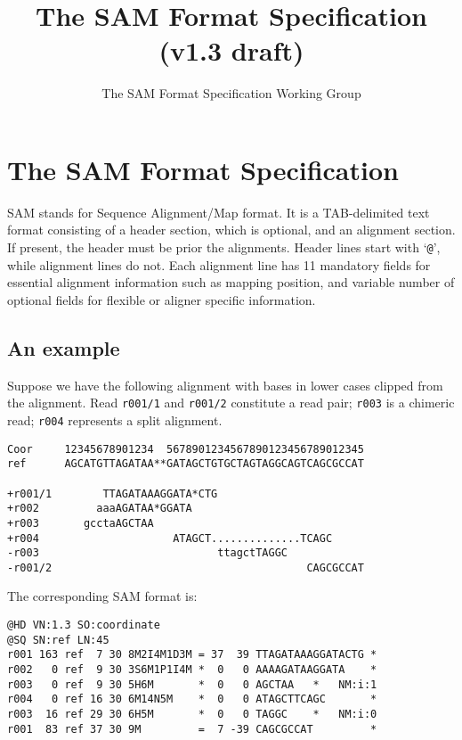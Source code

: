 \documentclass[10pt]{article}
\title{The SAM Format Specification (v1.3 draft)}
\author{The SAM Format Specification Working Group}
\begin{document}
\maketitle


\section{The SAM Format Specification}
SAM stands for Sequence Alignment/Map format. It is a TAB-delimited text
format consisting of a header section, which is optional, and an
alignment section. If present, the header must be prior the
alignments. Header lines start with `{\tt @}', while alignment lines do
not. Each alignment line has 11 mandatory fields for essential alignment
information such as mapping position, and variable number of optional
fields for flexible or aligner specific information.

\subsection{An example}
Suppose we have the following alignment with bases in lower cases
clipped from the alignment. Read {\tt r001/1} and {\tt r001/2}
constitute a read pair; {\tt r003} is a chimeric read; {\tt r004}
represents a split alignment.

\begin{framed}\small
\begin{verbatim}
Coor     12345678901234  5678901234567890123456789012345
ref      AGCATGTTAGATAA**GATAGCTGTGCTAGTAGGCAGTCAGCGCCAT

+r001/1        TTAGATAAAGGATA*CTG
+r002         aaaAGATAA*GGATA
+r003       gcctaAGCTAA
+r004                     ATAGCT..............TCAGC
-r003                            ttagctTAGGC
-r001/2                                        CAGCGCCAT
\end{verbatim}
\end{framed}
The corresponding SAM format is:
\begin{framed}\small
\begin{verbatim}
@HD VN:1.3 SO:coordinate
@SQ SN:ref LN:45
r001 163 ref  7 30 8M2I4M1D3M = 37  39 TTAGATAAAGGATACTG *
r002   0 ref  9 30 3S6M1P1I4M *  0   0 AAAAGATAAGGATA    *
r003   0 ref  9 30 5H6M       *  0   0 AGCTAA   *   NM:i:1
r004   0 ref 16 30 6M14N5M    *  0   0 ATAGCTTCAGC       *
r003  16 ref 29 30 6H5M       *  0   0 TAGGC    *   NM:i:0
r001  83 ref 37 30 9M         =  7 -39 CAGCGCCAT         *
\end{verbatim}
\end{framed}
\end{document}
